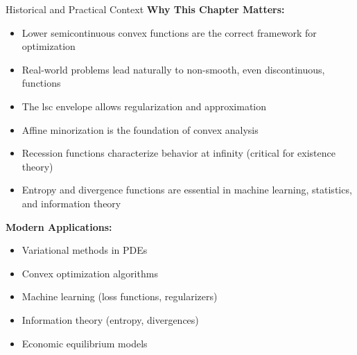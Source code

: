 \documentclass[aspectratio=169,10pt]{beamer}
\begin{document}
\begin{frame}{Historical and Practical Context}
\textbf{Why This Chapter Matters:}

\begin{itemize}
    \item Lower semicontinuous convex functions are the correct framework for optimization
    \item Real-world problems lead naturally to non-smooth, even discontinuous, functions
    \item The lsc envelope allows regularization and approximation
    \item Affine minorization is the foundation of convex analysis
    \item Recession functions characterize behavior at infinity (critical for existence theory)
    \item Entropy and divergence functions are essential in machine learning, statistics, and information theory
\end{itemize}

\vspace{0.4cm}
\textbf{Modern Applications:}
\begin{itemize}
    \item Variational methods in PDEs
    \item Convex optimization algorithms
    \item Machine learning (loss functions, regularizers)
    \item Information theory (entropy, divergences)
    \item Economic equilibrium models
\end{itemize}
\end{frame}
\end{document}
